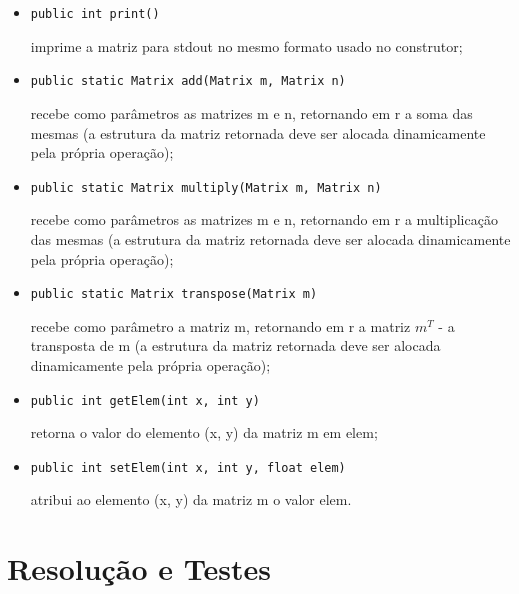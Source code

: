 \documentclass[a4paper,10pt]{article}
\begin{document}
\begin{itemize}
  \item[] \begin{verbatim}public int print()\end{verbatim} imprime a matriz para stdout no mesmo formato usado no construtor;
  \item[] \begin{verbatim}public static Matrix add(Matrix m, Matrix n)\end{verbatim} recebe como parâmetros as matrizes m e n, retornando em r a soma das mesmas (a estrutura da matriz retornada deve ser alocada dinamicamente pela própria operação);
  \item[] \begin{verbatim}public static Matrix multiply(Matrix m, Matrix n)\end{verbatim} recebe como parâmetros as matrizes m e n, retornando em r a multiplicação das mesmas (a estrutura da matriz retornada deve ser alocada dinamicamente pela própria operação);
  \item[] \begin{verbatim}public static Matrix transpose(Matrix m)\end{verbatim} recebe como parâmetro a matriz m, retornando em r a matriz $m^{T}$ - a transposta de m (a estrutura da matriz retornada deve ser alocada dinamicamente pela própria operação);
  \item[] \begin{verbatim}public int getElem(int x, int y)\end{verbatim} retorna o valor do elemento (x, y) da matriz m em elem;
  \item[] \begin{verbatim}public int setElem(int x, int y, float elem)\end{verbatim} atribui ao elemento (x, y) da matriz m o valor elem.
\end{itemize}





\section*{Resolução e Testes}
\end{document}
